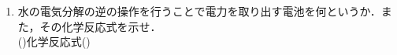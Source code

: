\begin{enumerate}
\begin{enumerate}
        (\hspace{3cm})\hspace{1cm}例(\hspace{2cm})
    \end{enumerate}
    \item 水の電気分解の逆の操作を行うことで電力を取り出す電池を何というか．また，その化学反応式を示せ．\\
    (\hspace{2cm})\hspace{1cm}化学反応式(\hspace{8cm})
\end{enumerate}
